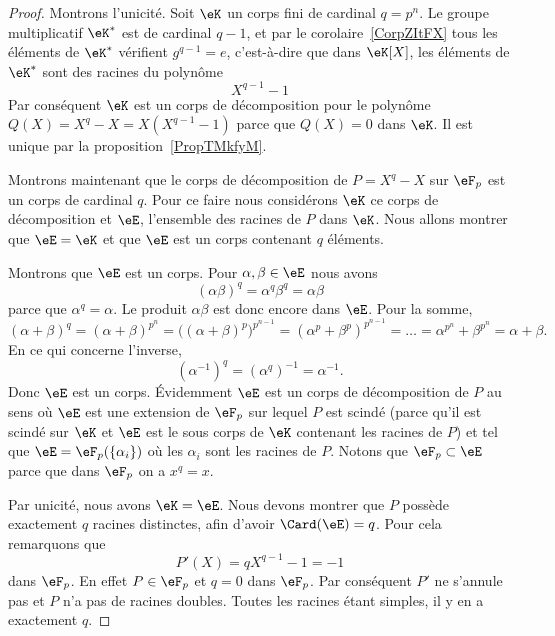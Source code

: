 \begin{proof}
    Montrons l'unicité. Soit \( \eK\) un corps fini de cardinal \( q=p^n\). Le groupe multiplicatif \( \eK^*\) est de cardinal \( q-1\), et par le corolaire~\ref{CorpZItFX} tous les éléments de \( \eK^*\) vérifient \( g^{q-1}=e\), c'est-à-dire que dans \( \eK[X]\), les éléments de \( \eK^*\) sont des racines du polynôme
    \begin{equation}
        X^{q-1}-1
    \end{equation}
    Par conséquent \( \eK\) est un corps de décomposition pour le polynôme \( Q(X)=X^q-X=X(X^{q-1}-1)\) parce que \( Q(X)=0\) dans \( \eK\). Il est unique par la proposition~\ref{PropTMkfyM}.

    Montrons maintenant que le corps de décomposition de \( P=X^q-X\) sur \( \eF_p\) est un corps de cardinal \( q\). Pour ce faire nous considérons \( \eK\) ce corps de décomposition et \(\eE\), l'ensemble des racines de \( P\) dans \( \eK\). Nous allons montrer que \( \eE=\eK\) et que \( \eE\) est un corps contenant \( q\) éléments.

    Montrons que \( \eE\) est un corps. Pour \( \alpha,\beta\in \eE\) nous avons
    \begin{equation}
        (\alpha\beta)^q=\alpha^q\beta^q=\alpha\beta
    \end{equation}
    parce que \( \alpha^q=\alpha\). Le produit \( \alpha\beta\) est donc encore dans \( \eE\). Pour la somme,
    \begin{equation}
        (\alpha+\beta)^q=(\alpha+\beta)^{p^n}=\Big( (\alpha+\beta)^p \Big)^{p^{n-1}}=(\alpha^p+\beta^p)^{p^{n-1}}=\ldots=\alpha^{p^n}+\beta^{p^n}=\alpha+\beta.
    \end{equation}
    En ce qui concerne l'inverse,
    \begin{equation}
        (\alpha^{-1})^q=(\alpha^q)^{-1}=\alpha^{-1}.
    \end{equation}
    Donc \( \eE\) est un corps. Évidemment \( \eE\) est un corps de décomposition de \( P\) au sens où \( \eE\) est une extension de \( \eF_p\) sur lequel \( P\) est scindé (parce qu'il est scindé sur \( \eK\) et \( \eE\) est le sous corps de \( \eK\) contenant les racines de \( P\)) et tel que \( \eE=\eF_p(\{ \alpha_i \})\) où les \( \alpha_i\) sont les racines de \( P\). Notons que \( \eF_p\subset \eE\) parce que dans \( \eF_p\) on a \( x^q=x\).

    Par unicité, nous avons \( \eK=\eE\). Nous devons montrer que \( P\) possède exactement \( q\) racines distinctes, afin d'avoir \( \Card(\eE)=q\). Pour cela remarquons que
    \begin{equation}
        P'(X)=qX^{q-1}-1=-1
    \end{equation}
    dans \( \eF_p\). En effet \( P\in\eF_p\) et \( q=0\) dans \( \eF_p\). Par conséquent \( P'\) ne s'annule pas et \( P\) n'a pas de racines doubles. Toutes les racines étant simples, il y en a exactement \( q\).

\end{proof}

